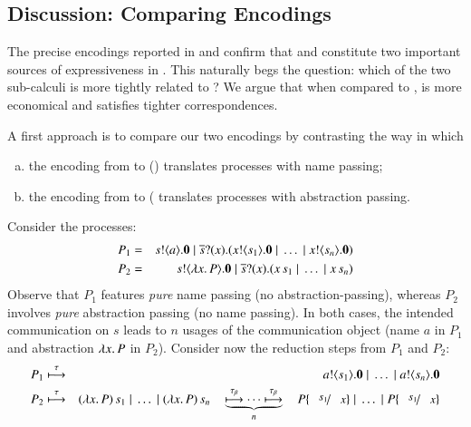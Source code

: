 
\subsection{Discussion: Comparing Encodings}
The precise encodings reported in   and 
confirm that \HO and \sessp constitute two important sources of expressiveness in \HOp.
This naturally begs the question: which of the two sub-calculi is more tightly related to \HOp?
We argue that when compared to \sessp, \HO   is more economical and satisfies tighter correspondences.

A first approach is to compare our two encodings by contrasting the way in which 
\begin{enumerate}[a)]
\item the encoding from \HOp to \HO () translates processes with name passing;
\item the encoding from \HOp to \sessp ( translates processes with abstraction passing.
\end{enumerate}
Consider the \HOp processes:
\begin{eqnarray*}
P_1 & = & s ! \langle a \rangle . \mathbf{0} \;|\; \overline{s} ? (x) . (x ! \langle s_1 \rangle . \mathbf{0} \;|\; \dots \;|\; x ! \langle s_n \rangle . \mathbf{0}) \\
P_2 & = & s ! \langle \lambda x.\,P \rangle . \mathbf{0} \;|\; \overline{s} ? (x) . (x\, {s_1} \;|\; \dots \;|\; x\, {s_n})
\end{eqnarray*}
\noi Observe that $P_1$ features \emph{pure} name passing (no abstraction-passing), whereas 
$P_2$ involves \emph{pure} abstraction passing (no name passing). In both cases, 
the intended communication on $s$ leads to $n$ usages of the communication object (name $a$ in $P_1$ and abstraction $\lambda x.\,P$ in $P_2$).
Consider now the reduction steps from $P_1$ and $P_2$:
\begin{eqnarray*}
P_1 & \hby{\tau} & \bout{a}{s_1} \inact \Par \dots \Par \bout{a}{s_n} \inact \\
P_2 & \hby{\tau}& \appl{(\abs{x}{P})}{s_1} \Par \dots \Par \appl{(\abs{x}{P})}{s_n} \quad \underbrace{\hby{\btau} \cdots \hby{\btau}}_{n} \quad P \subst{s_1}{x} \Par \dots \Par P \subst{s_1}{x} 
\end{eqnarray*}

